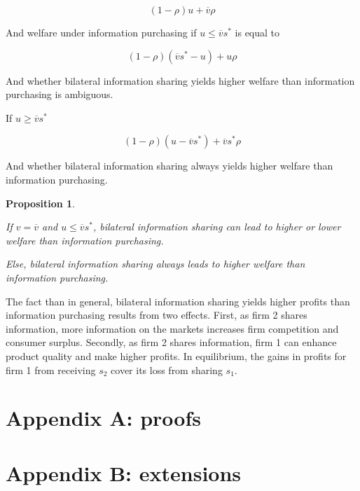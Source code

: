 \documentclass[a4paper,leqno]{article}%
\newtheorem{prop}{Proposition}
\newcommand{\ov}{\overline{v}}
\begin{document}
\medskip

\[
(1-\rho) u +\ov \rho
\]

\medskip

And welfare under information purchasing if $u\leq \ov s^*$ is equal to

\medskip

\[
(1-\rho) (\ov s^*-u)+u\rho
\]

\medskip

And whether bilateral information sharing yields higher welfare than information purchasing is ambiguous.

\medskip

If $u\geq \ov s^*$ 

\[
(1-\rho) (u-\ov s^*)+\ov s^*\rho
\]

And whether bilateral information sharing always yields higher welfare than information purchasing.


\medskip

\begin{prop}~~

If $v=\ov$ and $u\leq \ov s^*$, bilateral information sharing can lead to higher or lower welfare than information purchasing. 

Else, bilateral information sharing always leads to higher welfare than information purchasing.

\end{prop}

\medskip

The fact than in general, bilateral information sharing yields higher profits than information purchasing results from two effects. First, as firm 2 shares information, more information on the markets increases firm competition and consumer surplus. Secondly, as firm 2 shares information, firm 1 can enhance product quality and make higher profits. In equilibrium, the gains in profits for firm 1 from receiving $s_2$ cover its loss from sharing $s_1$. 

\medskip






\appendix

\section{Appendix A: proofs}

\section{Appendix B: extensions}
\end{document}
